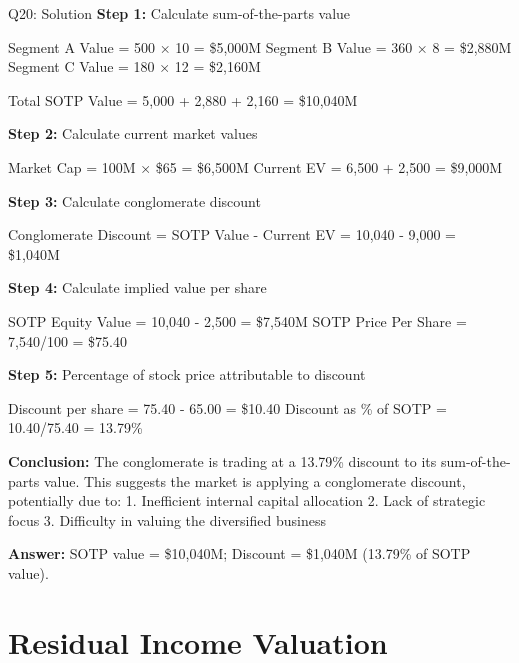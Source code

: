 \documentclass{beamer}
\renewcommand{\scriptsize}{\fontsize{6pt}{7pt}\selectfont}
\begin{document}
	\begin{frame}{Q20: Solution}
		\scriptsize
		\textbf{Step 1:} Calculate sum-of-the-parts value
		
		Segment A Value = 500 × 10 = \$5,000M
		Segment B Value = 360 × 8 = \$2,880M
		Segment C Value = 180 × 12 = \$2,160M
		
		Total SOTP Value = 5,000 + 2,880 + 2,160 = \$10,040M
		
		\vspace{2pt}
		\textbf{Step 2:} Calculate current market values
		
		Market Cap = 100M × \$65 = \$6,500M
		Current EV = 6,500 + 2,500 = \$9,000M
		
		\vspace{2pt}
		\textbf{Step 3:} Calculate conglomerate discount
		
		Conglomerate Discount = SOTP Value - Current EV = 10,040 - 9,000 = \$1,040M
		
		\vspace{2pt}
		\textbf{Step 4:} Calculate implied value per share
		
		SOTP Equity Value = 10,040 - 2,500 = \$7,540M
		SOTP Price Per Share = 7,540/100 = \$75.40
		
		\vspace{2pt}
		\textbf{Step 5:} Percentage of stock price attributable to discount
		
		Discount per share = 75.40 - 65.00 = \$10.40
		Discount as \% of SOTP = 10.40/75.40 = 13.79\%
		
		\vspace{2pt}
		\textbf{Conclusion:} The conglomerate is trading at a 13.79\% discount to its sum-of-the-parts value. This suggests the market is applying a conglomerate discount, potentially due to:
		1. Inefficient internal capital allocation
		2. Lack of strategic focus
		3. Difficulty in valuing the diversified business
		
		\textbf{Answer:} SOTP value = \$10,040M; Discount = \$1,040M (13.79\% of SOTP value).
	\end{frame}
	
	
	\section{Residual Income Valuation}
	
\end{document}
